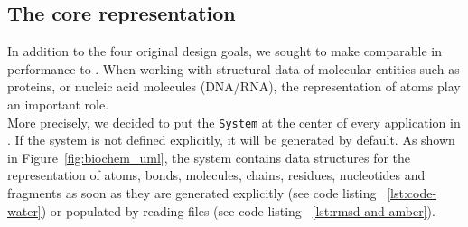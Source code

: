 \subsection{The core representation}
In addition to the four original design goals, we sought to make \biochem comparable in performance to \ball. When working with structural data of molecular entities such as proteins, or nucleic acid molecules (DNA/RNA), the representation of atoms play an important role. \\
More precisely, we decided to put the \texttt{System} at the center of every application in \biochem. If the system is not defined explicitly, it will be generated by default. As shown in Figure~\ref{fig:biochem_uml}, the system contains data structures for the representation of atoms, bonds, molecules, chains, residues, nucleotides and fragments as soon as they are generated explicitly (see code listing ~\ref{lst:code-water})  or populated by reading files (see code listing ~\ref{lst:rmsd-and-amber}).   \\

